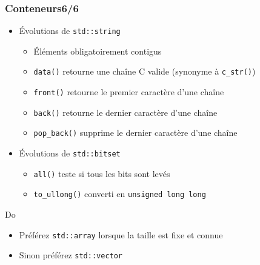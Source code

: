 \documentclass[C++.tex]{subfiles}
\begin{document}
\begin{frame}[fragile]
	\frametitle{Conteneurs\titlehfill{}6/6}
	\begin{itemize}
		\item Évolutions de \lstinline|std::string|
		\begin{itemize}
			\item Éléments obligatoirement contigus
			\item \lstinline|data()| retourne une chaîne C valide (synonyme à \lstinline|c_str()|)


			\item \lstinline|front()| retourne le premier caractère d'une chaîne
			\item \lstinline|back()| retourne le dernier caractère d'une chaîne
			\item \lstinline|pop_back()| supprime le dernier caractère d'une chaîne
		\end{itemize}
		\item Évolutions de \lstinline|std::bitset|
		\begin{itemize}
			\item \lstinline|all()| teste si tous les bits sont levés
			\item \lstinline|to_ullong()| converti en \lstinline|unsigned long long|
		\end{itemize}
	\end{itemize}

	\begin{exampleblock}{Do}
		\begin{itemize}
			\item Préférez \lstinline|std::array| lorsque la taille est fixe et connue
			\item Sinon préférez \lstinline|std::vector| 
		\end{itemize}
	\end{exampleblock}
\end{frame}
\end{document}
